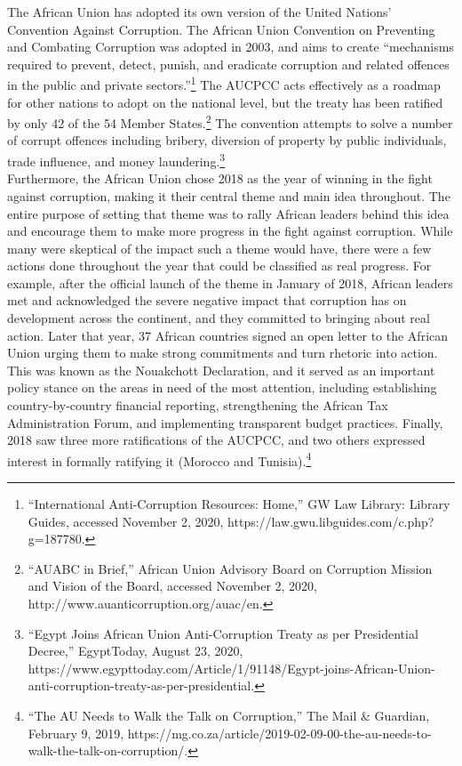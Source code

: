 \documentclass[10pt, letterpaper]{article}
\begin{document}
The African Union has adopted its own version of the United Nations'
Convention Against Corruption. The African Union Convention on
Preventing and Combating Corruption was adopted in 2003, and aims to
create ``mechanisms required to prevent, detect, punish, and eradicate
corruption and related offences in the public and private
sectors.''\footnote{``International Anti-Corruption Resources: Home,''
  GW Law Library: Library Guides, accessed November 2, 2020,
  https://law.gwu.libguides.com/c.php?g=187780.} The AUCPCC acts
effectively as a roadmap for other nations to adopt on the national
level, but the treaty has been ratified by only 42 of the 54 Member
States.\footnote{``AUABC in Brief,'' African Union Advisory Board on
  Corruption \textbar{} Mission and Vision of the Board, accessed
  November 2, 2020, http://www.auanticorruption.org/auac/en.} The
convention attempts to solve a number of corrupt offences including
bribery, diversion of property by public individuals, trade influence,
and money laundering.\footnote{``Egypt Joins African Union
  Anti-Corruption Treaty as per Presidential Decree,'' EgyptToday,
  August 23, 2020,
  https://www.egypttoday.com/Article/1/91148/Egypt-joins-African-Union-anti-corruption-treaty-as-per-presidential.} \\

Furthermore, the African Union chose 2018 as the year of winning in the
fight against corruption, making it their central theme and main idea
throughout. The entire purpose of setting that theme was to rally
African leaders behind this idea and encourage them to make more
progress in the fight against corruption. While many were skeptical of
the impact such a theme would have, there were a few actions done
throughout the year that could be classified as real progress. For
example, after the official launch of the theme in January of 2018,
African leaders met and acknowledged the severe negative impact that
corruption has on development across the continent, and they committed
to bringing about real action. Later that year, 37 African countries
signed an open letter to the African Union urging them to make strong
commitments and turn rhetoric into action. This was known as the
Nouakchott Declaration, and it served as an important policy stance on
the areas in need of the most attention, including establishing
country-by-country financial reporting, strengthening the African Tax
Administration Forum, and implementing transparent budget practices.
Finally, 2018 saw three more ratifications of the AUCPCC, and two others
expressed interest in formally ratifying it (Morocco and
Tunisia).\footnote{``The AU Needs to Walk the Talk on Corruption,'' The
  Mail \& Guardian, February 9, 2019,
  https://mg.co.za/article/2019-02-09-00-the-au-needs-to-walk-the-talk-on-corruption/.} \\
\end{document}
